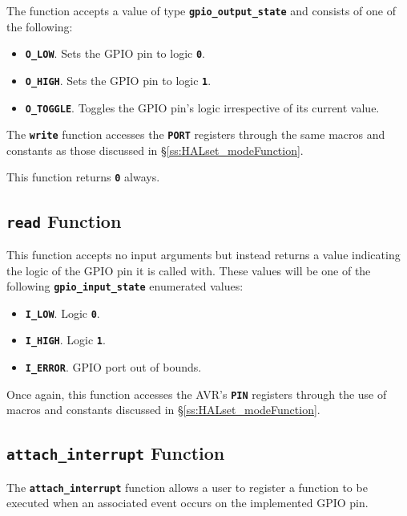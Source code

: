\documentclass[a4paper, oneside, 11pt, titlepage, onecolumn, openright]{report}
\begin{document}
			The function accepts a value of type \textbf{\texttt{gpio\_output\_state}} and consists of one of the following:
			
\begin{itemize}
\item \textbf{\texttt{O\_LOW}}. Sets the GPIO pin to logic \textbf{\texttt{0}}.
\item \textbf{\texttt{O\_HIGH}}. Sets the GPIO pin to logic \textbf{\texttt{1}}.
\item \textbf{\texttt{O\_TOGGLE}}. Toggles the GPIO pin's logic irrespective of its current value.
\end{itemize}

The \textbf{\texttt{write}} function accesses the \textbf{\texttt{PORT}} registers through the same macros and constants as those discussed in \S\ref{ss:HALset_modeFunction}.

This function returns \textbf{\texttt{0}} always.

\subsection{\textbf{\texttt{read}} Function}
			\label{ss:HALreadFunction}
			
			This function accepts no input arguments but instead returns a value indicating the logic of the GPIO pin it is called with. These values will be one of the following \textbf{\texttt{gpio\_input\_state}} enumerated values:
			
\begin{itemize}
\item \textbf{\texttt{I\_LOW}}. Logic \textbf{\texttt{0}}.
\item \textbf{\texttt{I\_HIGH}}. Logic \textbf{\texttt{1}}.
\item \textbf{\texttt{I\_ERROR}}. GPIO port out of bounds.
\end{itemize}

			Once again, this function accesses the AVR's \textbf{\texttt{PIN}} registers through the use of macros and constants discussed in \S\ref{ss:HALset_modeFunction}.
			
\subsection{\textbf{\texttt{attach\_interrupt}} Function}
			\label{ss:HALattach_interruptFunction}
			
			The \textbf{\texttt{attach\_interrupt}} function allows a user to register a function to be executed when an associated event occurs on the implemented GPIO pin.
			
\end{document}
